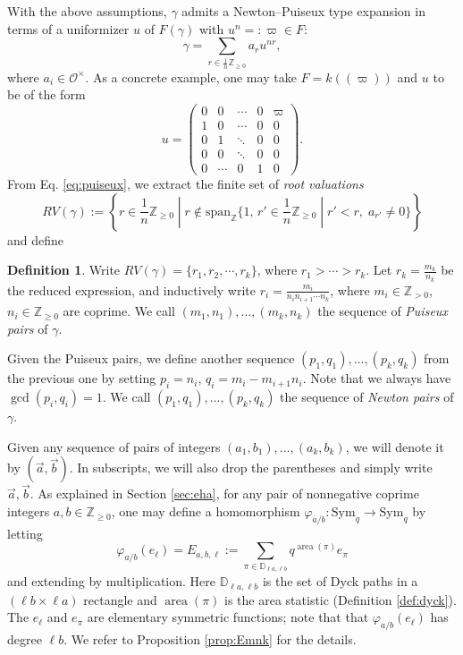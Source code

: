\documentclass{amsart}
\numberwithin{equation}{section}
\theoremstyle{definition}
\newtheorem{definition}[lemma]{Definition}%
\def\Sym{{\mathrm{Sym}}}
\newcommand{\cO}{\mathcal{O}}
\newcommand{\Z}{{\mathbb Z}}
\newcommand{\Dyck}{\mathbb{D}}
\DeclareMathOperator{\area}{\mathrm{area}}
\begin{document}
With the above assumptions, $\gamma$ admits a Newton--Puiseux type expansion in terms of a uniformizer $u$ of $F(\gamma)$ with $u^n=:\varpi\in F$:
\begin{equation}
\label{eq:puiseux}
\gamma=\sum_{r\in\frac{1}{n}\Z_{\ge 0}} a_r u^{nr},
\end{equation}
where $a_i\in\cO^{\times}$. As a concrete example, one may take $F=k((\varpi))$ and $u$ to be of the form
\begin{equation}
\label{eq:umatrix}
u=\begin{pmatrix}
0 & 0 & \cdots & 0 & \varpi\\
1 & 0 & \cdots & 0 & 0\\
0 & 1 & \ddots & 0 & 0\\
0 & 0 & \ddots & 0 & 0\\
0 & \cdots & 0 & 1 & 0
\end{pmatrix}.
\end{equation}
From Eq. \eqref{eq:puiseux}, we extract the finite set of {\em root valuations}
\[
RV(\gamma):=\left\{r\in\frac{1}{n}\Z_{\ge 0}\;|\;r\not\in\mathrm{span}_{\Z}\{1,\,r'\in\frac{1}{n}\Z_{\ge 0}\;|\;r'<r,\;a_{r'}\not=0\}\right\}
\]
and define
\begin{definition}
\label{def:puiseux} 
Write $RV(\gamma)=\{r_1, r_2,\cdots,r_k\}$, where $r_1>\cdots>r_k$. Let $r_k=\frac{m_k}{n_k}$ be the reduced expression, and inductively write $r_i=\frac{m_i}{n_in_{i+1}\cdots n_{k}}$, where $m_i\in\Z_{>0}$, $n_i\in\Z_{\ge 0}$ are coprime. We call $(m_1,n_1),\ldots,(m_k,n_k)$ the sequence of {\em Puiseux pairs} of $\gamma$.

Given the Puiseux pairs, we define another sequence $(p_1,q_1),\ldots, (p_k,q_k)$ from the previous one by setting $p_i=n_i$, $q_i=m_i-m_{i+1}n_i$. Note that we always have $\gcd(p_i,q_i)=1$. We call $(p_1,q_1),\ldots,(p_k,q_k)$ the sequence of {\em Newton pairs} of $\gamma$. 
\end{definition}
Given any sequence of pairs of integers $(a_1,b_1),\ldots, (a_k,b_k)$, we will denote it by $(\vec{a},\vec{b})$. In subscripts, we will also drop the parentheses and simply write $\vec{a},\vec{b}$.
As explained in Section \ref{sec:eha}, for any pair of nonnegative coprime integers $a,b\in \Z_{\geq 0}$, one may define a homomorphism $\varphi_{a/b}: \Sym_{q}\to \Sym_q$ by letting
\begin{equation}\label{eq:phi_m/n}
\varphi_{a/b}(e_\ell)=E_{a,b,\ell}:=\sum_{\pi\in \Dyck_{\ell a,\ell b}}q^{\area(\pi)}e_\pi
\end{equation}
and extending by multiplication. Here $\Dyck_{\ell a,\ell b}$ is the set of Dyck paths in a $(\ell b\times \ell a)$ rectangle and $\area(\pi)$ is the area statistic (Definition \ref{def:dyck}). The $e_\ell$ and $e_\pi$ are elementary symmetric functions; note that that $\varphi_{a/b}(e_\ell)$ has degree $\ell b$. We refer to Proposition \ref{prop:Emnk} for the details.
\end{document}
